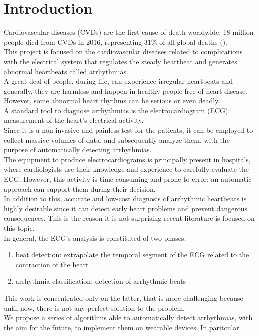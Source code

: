 \documentclass[LaM,binding=0.6cm]{sapthesis}
\begin{document}
\chapter{Introduction}
Cardiovascular diseases (CVDs) are the first cause of death worldwide: 18 million people died from CVDs in 2016, representing 31\% of all global deaths (\cite{who}).\\This project is focused on the cardiovascular diseases related to complications with the electrical system that regulates the steady heartbeat and generates abnormal heartbeats called arrhythmias.\\A great deal of people, during life, can experience irregular heartbeats and generally,  they are harmless and happen in healthy people free of heart disease.\\However, some abnormal heart rhythms can be serious or even deadly.\\A standard tool to diagnose arrhythmias is the electrocardiogram (ECG): measurement of the heart's electrical activity.\\Since it is a non-invasive and painless test for the patients, it can be employed to collect massive volumes of data, and subsequently analyze them, with the purpose of automatically detecting arrhythmias.\\The equipment to produce electrocardiograms is principally present in hospitals, where cardiologists use their knowledge and experience to carefully evaluate the ECG. However, this activity is time-consuming and prone to error: an automatic approach can support them during their decision.\\In addition to this, accurate and low-cost diagnosis of arrhythmic heartbeats is highly desirable since it can detect early heart problems and prevent dangerous consequences. This is the reason it is not surprising recent literature is focused on this topic.\\In general, the ECG's analysis is constituted of two phases:
\begin{enumerate}
\item beat detection: extrapolate the temporal segment of the ECG related to the contraction of the heart
\item arrhythmia  classification: detection of arrhythmic beats
\end{enumerate} 
This work is concentrated only on the latter, that is more challenging because until now, there is not any perfect solution to the problem.\\We propose a series of algorithms able to automatically detect arrhythmias, with the aim for the future, to implement them on wearable devices.
In paritcular
\end{document}
